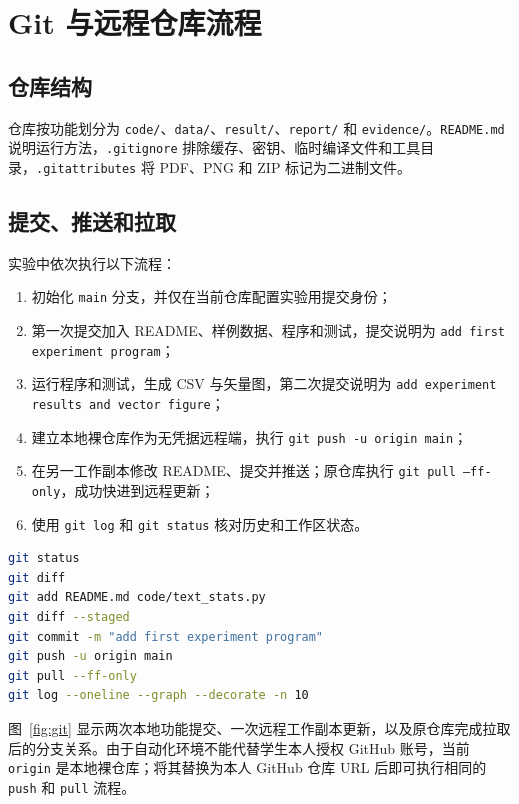 \documentclass[UTF8,a4paper,zihao=-4]{ctexart}
\begin{document}
\section{Git 与远程仓库流程}

\subsection{仓库结构}

仓库按功能划分为 \texttt{code/}、\texttt{data/}、\texttt{result/}、\texttt{report/} 和 \texttt{evidence/}。\texttt{README.md} 说明运行方法，\texttt{.gitignore} 排除缓存、密钥、临时编译文件和工具目录，\texttt{.gitattributes} 将 PDF、PNG 和 ZIP 标记为二进制文件。

\subsection{提交、推送和拉取}

实验中依次执行以下流程：

\begin{enumerate}[leftmargin=2.5em]
  \item 初始化 \texttt{main} 分支，并仅在当前仓库配置实验用提交身份；
  \item 第一次提交加入 README、样例数据、程序和测试，提交说明为 \texttt{add first experiment program}；
  \item 运行程序和测试，生成 CSV 与矢量图，第二次提交说明为 \texttt{add experiment results and vector figure}；
  \item 建立本地裸仓库作为无凭据远程端，执行 \texttt{git push -u origin main}；
  \item 在另一工作副本修改 README、提交并推送；原仓库执行 \texttt{git pull --ff-only}，成功快进到远程更新；
  \item 使用 \texttt{git log} 和 \texttt{git status} 核对历史和工作区状态。
\end{enumerate}

\begin{lstlisting}[language=bash,caption={核心 Git 命令}]
git status
git diff
git add README.md code/text_stats.py
git diff --staged
git commit -m "add first experiment program"
git push -u origin main
git pull --ff-only
git log --oneline --graph --decorate -n 10
\end{lstlisting}

图~\ref{fig:git} 显示两次本地功能提交、一次远程工作副本更新，以及原仓库完成拉取后的分支关系。由于自动化环境不能代替学生本人授权 GitHub 账号，当前 \texttt{origin} 是本地裸仓库；将其替换为本人 GitHub 仓库 URL 后即可执行相同的 \texttt{push} 和 \texttt{pull} 流程。
\end{document}
